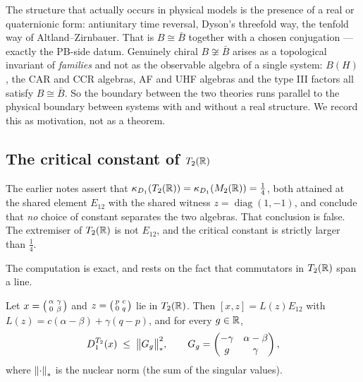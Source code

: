 \begin{remark}[Physics]\label{rem:physics}
The structure that actually occurs in physical models is the presence of a
real or quaternionic form: antiunitary time reversal, Dyson's threefold way,
the tenfold way of Altland--Zirnbauer.  That is $B\cong\bar B$ together with a
chosen conjugation --- exactly the PB-side datum.  Genuinely chiral
$B\not\cong\bar B$ arises as a topological invariant of \emph{families} and not
as the observable algebra of a single system: $B(H)$, the CAR and CCR algebras,
AF and UHF algebras and the type III factors all satisfy $B\cong\bar B$.  So the
boundary between the two theories runs parallel to the physical boundary
between systems with and without a real structure.  We record this as
motivation, not as a theorem.
\end{remark}

\subsection{The critical constant of $T_2(\mathbb{R})$}
\label{sec:T2-constant}

The earlier notes assert that $\kappa_{D_1}(T_2(\mathbb{R}))=\kappa_{D_1}(M_2(\mathbb{R}))=\tfrac14$,
both attained at the shared element $E_{12}$ with the shared witness
$z=\operatorname{diag}(1,-1)$, and conclude that \emph{no} choice of constant
separates the two algebras.  That conclusion is false.  The extremiser of
$T_2(\mathbb{R})$ is not $E_{12}$, and the critical constant is strictly larger than
$\tfrac14$.

The computation is exact, and rests on the fact that commutators in $T_2(\mathbb{R})$
span a line.

\begin{lemma}\label{lem:dual-certificate}
Let $x=\begin{psmallmatrix}\alpha&\gamma\\0&\beta\end{psmallmatrix}$ and
$z=\begin{psmallmatrix}p&c\\0&q\end{psmallmatrix}$ lie in $T_2(\mathbb{R})$.  Then
$[x,z]=L(z)E_{12}$ with $L(z)=c(\alpha-\beta)+\gamma(q-p)$, and for every
$g\in\mathbb{R}$,
\[
  D_1^{T_2}(x)\;\le\;\bigl\lVert G_g\bigr\rVert_*^2,
  \qquad
  G_g=\begin{pmatrix}-\gamma&\alpha-\beta\\ g&\gamma\end{pmatrix},
\]
where $\left\lVert\cdot\right\rVert_*$ is the nuclear norm (the sum of the singular values).
\end{lemma}

